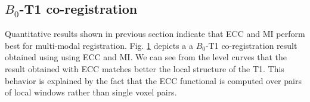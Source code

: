 \subsection{$B_{0}$-T1 co-registration}
Quantitative results shown in previous section indicate that ECC and MI perform best for multi-modal registration. Fig. \ref{fig:comparison_B0_T1_coregistration} depicts a a $B_{0}$-T1 co-registration result obtained using using ECC and MI. We can see from the level curves that the result obtained with ECC matches better the local structure of the T1. This behavior is explained by the fact that the ECC functional is computed over pairs of local windows rather than single voxel pairs. 
\begin{figure}[H]
\centering
    \\
    \caption{}
\label{fig:comparison_B0_T1_coregistration}
\end{figure}

